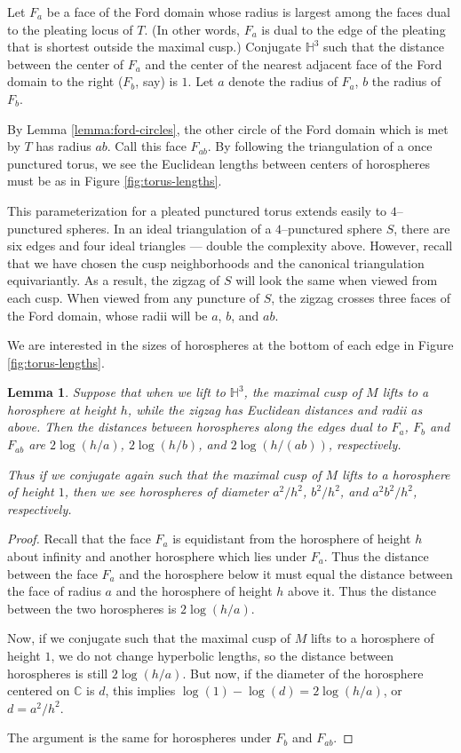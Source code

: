 \documentclass[11pt]{amsart}
\newcommand{\HH}{{\mathbb{H}}}
\newcommand{\CC}{{\mathbb{C}}}
\theoremstyle{plain}
\newtheorem{lemma}[theorem]{Lemma}
\theoremstyle{definition}
\begin{document}
Let $F_a$ be a face of the Ford domain whose radius is largest among
the faces dual to the pleating locus of $T$. (In other words, $F_a$ is
dual to the edge of the pleating that is shortest outside the maximal
cusp.)  Conjugate $\HH^3$ such that the distance between the center of
$F_a$ and the center of the nearest adjacent face of the Ford domain
to the right ($F_b$, say) is $1$.  Let $a$ denote the radius of $F_a$,
$b$ the radius of $F_b$.

By Lemma \ref{lemma:ford-circles}, the other circle of the Ford domain
which is met by $T$ has radius $ab$.  Call this face $F_{ab}$.  By
following the triangulation of a once punctured torus, we see the
Euclidean lengths between centers of horospheres must be as in Figure
\ref{fig:torus-lengths}.  

This parameterization for a pleated punctured torus extends easily to
$4$--punctured spheres.  In an ideal triangulation of a $4$--punctured
sphere $S$, there are six edges and four ideal triangles --- double
the complexity above.  However, recall that we have chosen the cusp
neighborhoods and the canonical triangulation equivariantly.  As a
result, the zigzag of $S$ will look the same when viewed from each
cusp.  When viewed from any puncture of $S$, the zigzag crosses three
faces of the Ford domain, whose radii will be $a$, $b$, and $ab$.

We are interested in the sizes of horospheres at the bottom of each
edge in Figure \ref{fig:torus-lengths}.

\begin{lemma}
Suppose that when we lift to $\HH^3$, the maximal cusp of $M$ lifts to
a horosphere at height $h$, while the zigzag has Euclidean distances
and radii as above.  Then the distances between horospheres along the
edges dual to $F_a$, $F_b$ and $F_{ab}$ are $2\log(h/a)$,
$2\log(h/b)$, and $2\log(h/(ab))$, respectively.

Thus if we conjugate again such that the maximal cusp of $M$ lifts to
a horosphere of height $1$, then we see horospheres of diameter
$a^2/h^2$, $b^2/h^2$, and $a^2b^2/h^2$, respectively.
\label{lemma:horo-sizes}
\end{lemma}

\begin{proof}
Recall that the face $F_a$ is equidistant from the horosphere of
height $h$ about infinity and another horosphere which lies under
$F_a$.  Thus the distance between the face $F_a$ and the horosphere
below it must equal the distance between the face of radius $a$ and
the horosphere of height $h$ above it.  Thus the distance between the
two horospheres is $2\log(h/a)$.

Now, if we conjugate such that the maximal cusp of $M$ lifts to a
horosphere of height $1$, we do not change hyperbolic lengths, so the
distance between horospheres is still $2\log(h/a)$.  But now, if the
diameter of the horosphere centered on $\CC$ is $d$, this implies
$\log(1) - \log(d) = 2\log(h/a)$, or $d= a^2/h^2$.

The argument is the same for horospheres under $F_b$ and $F_{ab}$.
\end{proof}
\end{document}
